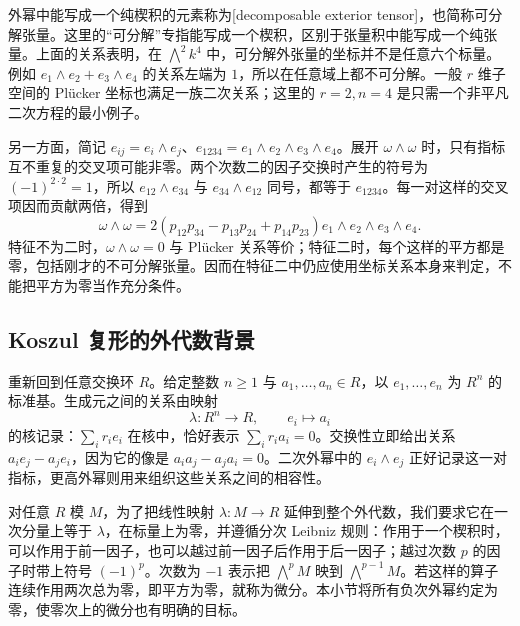 外幂中能写成一个纯楔积的元素称为[decomposable exterior tensor]，也简称可分解张量。这里的“可分解”专指能写成一个楔积，区别于张量积中能写成一个纯张量。上面的关系表明，在 \(\bigwedge^2k^4\) 中，可分解外张量的坐标并不是任意六个标量。例如 \(e_1\wedge e_2+e_3\wedge e_4\) 的关系左端为 \(1\)，所以在任意域上都不可分解。一般 \(r\) 维子空间的 Plücker 坐标也满足一族二次关系；这里的 \(r=2,n=4\) 是只需一个非平凡二次方程的最小例子。

\ProseParagraphBreak
另一方面，简记 \(e_{ij}=e_i\wedge e_j\)、\(e_{1234}=e_1\wedge e_2\wedge e_3\wedge e_4\)。展开 \(\omega\wedge\omega\) 时，只有指标互不重复的交叉项可能非零。两个次数二的因子交换时产生的符号为 \((-1)^{2\cdot2}=1\)，所以 \(e_{12}\wedge e_{34}\) 与 \(e_{34}\wedge e_{12}\) 同号，都等于 \(e_{1234}\)。每一对这样的交叉项因而贡献两倍，得到
\[
	\omega\wedge\omega =2(p_{12}p_{34}-p_{13}p_{24}+p_{14}p_{23}) e_1\wedge e_2\wedge e_3\wedge e_4.
\]
特征不为二时，\(\omega\wedge\omega=0\) 与 Plücker 关系等价；特征二时，每个这样的平方都是零，包括刚才的不可分解张量。因而在特征二中仍应使用坐标关系本身来判定，不能把平方为零当作充分条件。

\subsection{Koszul 复形的外代数背景}
\label{b2:subsec:0904:03}

重新回到任意交换环 \(R\)。给定整数 \(n\ge1\) 与 \(a_1,\ldots,a_n\in R\)，以 \(e_1,\ldots,e_n\) 为 \(R^n\) 的标准基。生成元之间的关系由映射
\[
	\lambda:R^n\longrightarrow R,\qquad e_i\longmapsto a_i
\]
的核记录：\(\sum_i r_ie_i\) 在核中，恰好表示 \(\sum_i r_i a_i=0\)。交换性立即给出关系 \(a_ie_j-a_je_i\)，因为它的像是 \(a_i a_j-a_j a_i=0\)。二次外幂中的 \(e_i\wedge e_j\) 正好记录这一对指标，更高外幂则用来组织这些关系之间的相容性。

\ProseParagraphBreak
对任意 \(R\) 模 \(M\)，为了把线性映射 \(\lambda:M\to R\) 延伸到整个外代数，我们要求它在一次分量上等于 \(\lambda\)，在标量上为零，并遵循分次 Leibniz 规则：作用于一个楔积时，可以作用于前一因子，也可以越过前一因子后作用于后一因子；越过次数 \(p\) 的因子时带上符号 \((-1)^p\)。次数为 \(-1\) 表示把 \(\bigwedge^pM\) 映到 \(\bigwedge^{p-1}M\)。若这样的算子连续作用两次总为零，即平方为零，就称为微分。本小节将所有负次外幂约定为零，使零次上的微分也有明确的目标。

